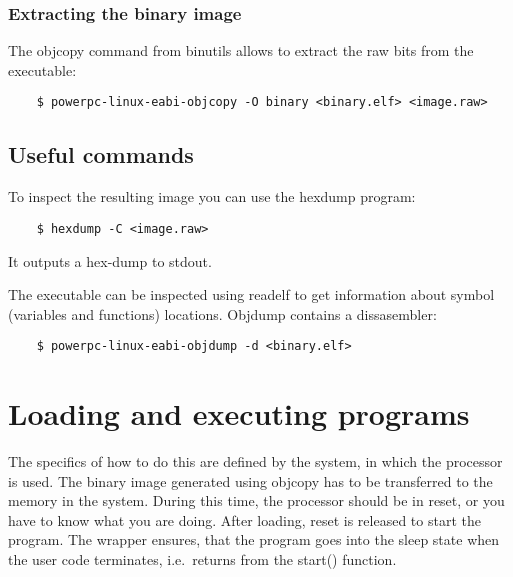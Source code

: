 \subsubsection{Extracting the binary image}

The objcopy command from binutils allows to extract the raw bits from the executable:
\begin{lstlisting}
    $ powerpc-linux-eabi-objcopy -O binary <binary.elf> <image.raw>
\end{lstlisting}


\subsection{Useful commands}

To inspect the resulting image you can use the hexdump program:
\begin{lstlisting}
    $ hexdump -C <image.raw>
\end{lstlisting}
It outputs a hex-dump to stdout.

The executable can be inspected using readelf to get information about symbol (variables and functions) locations.
Objdump contains a dissasembler:
\begin{lstlisting}
    $ powerpc-linux-eabi-objdump -d <binary.elf>
\end{lstlisting}


\section{Loading and executing programs}

The specifics of how to do this are defined by the system, in which the processor is used.
The binary image generated using objcopy has to be transferred to the memory in the system.
During this time, the processor should be in reset, or you have to know what you are doing.
After loading, reset is released to start the program.
The  wrapper ensures, that the program goes into the sleep state when the user code terminates, i.e.\ returns from the start() function.



